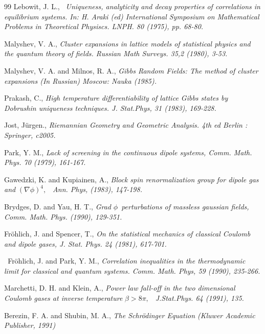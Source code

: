 \documentclass{article}
\begin{document}
\begin{thebibliography}{99}
\bibitem{} Lebowit, J. L., \textit{\ Uniqueness, analyticity and decay
properties of correlations in equilibrium systems. In: H. Araki (ed)
International Symposium on Mathematical Problems in Theoretical Physiscs.
LNPH. 80 (1975), pp. 68-80.}

\bibitem{} Malyshev, V. A., \textit{Cluster expansions in lattice models of
statistical physics and the quantum theory of fields. Russian Math Surveys.
35,2 (1980), 3-53.}

\bibitem{} Malyshev, V. A. and Milnos, R. A., \textit{Gibbs Random Fields:
The method of cluster expansions (In Russian) Moscow: Nauka (1985).}

\bibitem{} Prakash, C., \textit{High temperature differentiability of
lattice Gibbs states by Dobrushin uniqueness techniques. J. Stat.Phys, 31
(1983), 169-228.}

\bibitem{} Jost, J\"{u}rgen., \textit{Riemannian Geometry and Geometric
Analysis. 4th ed Berlin : Springer, c2005.}

\bibitem{} Park, Y. M., \textit{Lack of screening in the continuous dipole
systems, Comm. Math. Phys. 70 (1979), 161-167.}

\bibitem{} Gawedzki, K. and Kupiainen, A., \textit{Block spin
renormalization group for dipole gas and }$\left( \nabla \phi \right) ^{4},$%
\textit{\ Ann. Phys, (1983), 147-198.}

\bibitem{} Brydges, D. and Yau, H. T., \textit{Grad }$\phi $\textit{\
perturbations of massless gaussian fields, Comm. Math. Phys. (1990), 129-351.%
}

\bibitem{} Fr\"{o}hlich, J. and Spencer, T., \textit{On the statistical
mechanics of classical Coulomb and dipole gases, J. Stat. Phys. 24 (1981),
617-701.}

\bibitem{} \textit{\ }Fr\"{o}hlich, J. and Park, Y. M., \textit{Correlation
inequalities in the thermodynamic limit for classical and quantum systems.
Comm. Math. Phys, 59 (1990), 235-266.}

\bibitem{} Marchetti, D. H. and Klein, A., \textit{Power law fall-off in the
two dimensional Coulomb gases at inverse temperature }$\beta >8\pi ,$\textit{%
\ J.Stat.Phys. 64 (1991), 135.}

\bibitem{} Berezin, F. A. and Shubin, M. A., \textit{The Schr\"{o}dinger
Equation (Kluwer Academic Publisher, 1991)\pagebreak }
\end{thebibliography}
\end{document}

